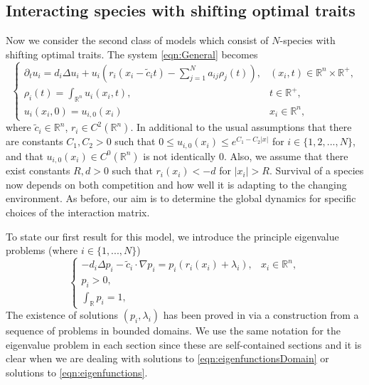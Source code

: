 \documentclass{article}
\def\strutdepth{\dp\strutbox}
\def \BVR#1{\strut\vadjust{\kern-\strutdepth\vtop to0pt{\vss\hbox to\hsize {\hskip\hsize\hskip5pt$\leftarrow$\hss\strut}}}{\em \textcolor{blue}{#1}}}
\newcommand{\md}[1]{{\color{red}Hong:  #1}}
\begin{document}
\subsection{Interacting species with shifting optimal traits}
Now we consider the second class of models which consist of $N$-species with shifting optimal traits. The system \eqref{eqn:General} becomes
\begin{equation}\label{eqn:ShiftingEnvironment}
      \begin{cases}
          \partial_{t}u_i=d_i\Delta{}u_i+u_i\left(r_i(x_i-\tilde{c}_it)-\sum_{j=1}^{N}a_{ij}\rho_j(t)\right),&(x_i,t)\in\mathbb{R}^n\times\mathbb{R}^{+},
    \\
\rho_i(t)=\int_{\mathbb{R}^n}u_i(x_i,t),&t\in\mathbb{R}^{+},\\
    
    u_i(x_i,0)=u_{i,0}(x_i)&x_i\in\mathbb{R}^n,
      \end{cases}
  \end{equation}
where $\tilde{c}_i\in\mathbb{R}^n$, $r_i\in{}C^2(\mathbb{R}^n)$. In additional to the usual assumptions that there are constants $C_1,C_2>0$ such that $0\leq{}u_{i,0}(x_i)\leq{}e^{C_1-C_2|x|}$ for $i\in\{1,2,...,N\}$, and that  $u_{i,0}(x_i)\in{}C^{0}(\mathbb{R}^n)$ is not identically $0$. Also, we assume that there exist constants $R,d>0$ such that  $r_i(x_i)<-d$ for $|x_i|>R$. Survival of a species now depends on both competition and how well it is adapting to the changing environment. As before, our aim is to determine the global dynamics for specific choices of the interaction matrix.

To state our first result for this model, we introduce the principle eigenvalue problems 
(where $i\in\{1,...,N\}$)
\begin{equation}\label{eqn:eigenfunctions}
      \begin{cases}
        -d_i\Delta{}p_i-\tilde{c}_i\cdot{}\nabla{}p_i=p_i\left(r_i(x_i)+\lambda_i\right),&x_i\in\mathbb{R}^n,
    \\
   p_i>0,\\
   \int_\mathbb{R}p_i=1,
      \end{cases}
  \end{equation}
The existence of solutions $(p_i,\lambda_i)$ has been proved in \cite{adaptivedynamicsdivergingfitness} via a construction from a sequence of problems in bounded domains. We use the same notation for the eigenvalue problem in each section since these are self-contained sections and it is clear when we are dealing with solutions to \eqref{eqn:eigenfunctionsDomain} or solutions to \eqref{eqn:eigenfunctions}. 
\end{document}
